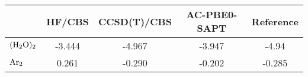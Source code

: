 \documentclass[a4paper,12pt, parskip=half]{scrartcl}
\begin{document}
\begin{table}
	\centering
	\label{tab:extrapolated}
	\begin{tabular}{l|cccc}
		\toprule
		                & HF/CBS & CCSD(T)/CBS & AC-PBE0-SAPT & Reference                               \\
		\midrule
		$ \ce{(H2O)2} $ & -3.444 & -4.967      & -3.947       & -4.94\autocite[]{schutz1997water}       \\
		$ \ce{Ar2} $    & 0.261  & -0.290      & -0.202       & -0.285\autocite[]{podeszwa2005accurate} \\
		\bottomrule
	\end{tabular}
\end{table}
%
\newpage
\end{document}
